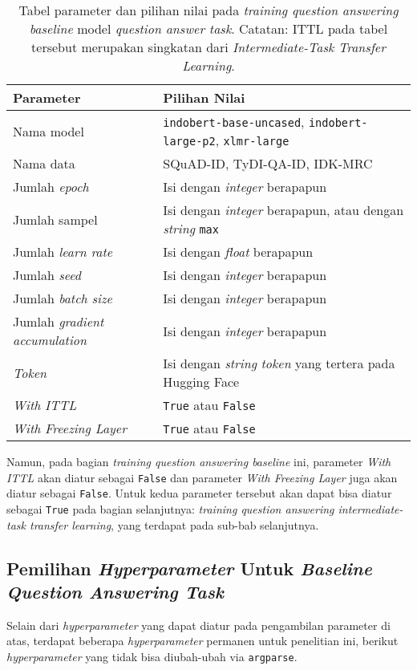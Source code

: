 \begin{table}[h!]
\centering
\begin{tabular}{|P{2.0in}|P{4.0in}|}
 \hline
 Parameter & Pilihan Nilai \\ [0.5ex] 
 \hline
 Nama model & \texttt{indobert-base-uncased}, \texttt{indobert-large-p2}, \texttt{xlmr-large} \\ 
 Nama data & SQuAD-ID, TyDI-QA-ID, IDK-MRC \\
 Jumlah \emph{epoch} & Isi dengan \emph{integer} berapapun \\
 Jumlah sampel & Isi dengan \emph{integer} berapapun, atau dengan \emph{string} \texttt{max} \\
 Jumlah \emph{learn rate} & Isi dengan \emph{float} berapapun \\ 
 Jumlah \emph{seed} & Isi dengan \emph{integer} berapapun \\ 
 Jumlah \emph{batch size} & Isi dengan \emph{integer} berapapun \\ 
 Jumlah \emph{gradient accumulation} & Isi dengan \emph{integer} berapapun \\ 
 \emph{Token} & Isi dengan \emph{string} \emph{token} yang tertera pada Hugging Face \\
 \emph{With ITTL} & \texttt{True} atau \texttt{False} \\
 \emph{With Freezing Layer} & \texttt{True} atau \texttt{False} \\ [1ex] 
 \hline
\end{tabular}
\caption{Tabel parameter dan pilihan nilai pada \emph{training question answering} \emph{baseline} model \emph{question answer task}. Catatan: ITTL pada tabel tersebut merupakan singkatan dari \emph{Intermediate-Task Transfer Learning}.}
\end{table}

Namun, pada bagian \emph{training question answering baseline} ini, parameter \emph{With ITTL} akan diatur sebagai \texttt{False} dan parameter \emph{With Freezing Layer} juga akan diatur sebagai \texttt{False}. Untuk kedua parameter tersebut akan dapat bisa diatur sebagai \texttt{True} pada bagian selanjutnya: \emph{training question answering intermediate-task transfer learning}, yang terdapat pada sub-bab selanjutnya.

\subsection{Pemilihan \emph{Hyperparameter} Untuk \emph{Baseline Question Answering Task}}
Selain dari \emph{hyperparameter} yang dapat diatur pada pengambilan parameter di atas, terdapat beberapa \emph{hyperparameter} permanen untuk penelitian ini, berikut \emph{hyperparameter} yang tidak bisa diubah-ubah via \texttt{argparse}.

